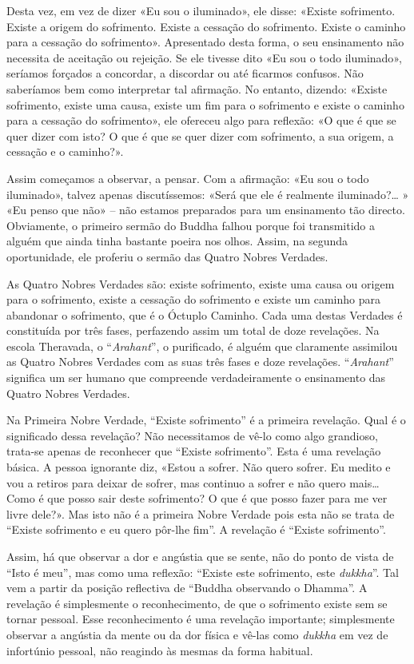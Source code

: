 Desta vez, em vez de dizer «Eu sou o iluminado», ele disse: «Existe sofrimento.
Existe a origem do sofrimento. Existe a cessação do sofrimento. Existe o caminho
para a cessação do sofrimento». Apresentado desta forma, o seu ensinamento não
necessita de aceitação ou rejeição. Se ele tivesse dito «Eu sou o todo
iluminado», seríamos forçados a concordar, a discordar ou até ficarmos confusos.
Não saberíamos bem como interpretar tal afirmação. No entanto, dizendo: «Existe
sofrimento, existe uma causa, existe um fim para o sofrimento e existe o caminho
para a cessação do sofrimento», ele ofereceu algo para reflexão: «O que é que se
quer dizer com isto? O que é que se quer dizer com sofrimento, a sua origem, a
cessação e o caminho?».

Assim começamos a observar, a pensar. Com a afirmação: «Eu sou o todo
iluminado», talvez apenas discutíssemos: «Será que ele é realmente
iluminado?\ldots{} » «Eu penso que não» – não estamos preparados para um ensinamento
tão directo. Obviamente, o primeiro sermão do Buddha falhou porque foi
transmitido a alguém que ainda tinha bastante poeira nos olhos. Assim, na
segunda oportunidade, ele proferiu o sermão das Quatro Nobres Verdades.

\sectionBreak

As Quatro Nobres Verdades são: existe sofrimento, existe uma causa ou origem
para o sofrimento, existe a cessação do sofrimento e existe um caminho para
abandonar o sofrimento, que é o Óctuplo Caminho. Cada uma destas Verdades é
constituída por três fases, perfazendo assim um total de doze revelações. Na
escola Theravada, o “\emph{Arahant}”, o purificado, é alguém que claramente
assimilou as Quatro Nobres Verdades com as suas três fases e doze revelações.
“\emph{Arahant}” significa um ser humano que compreende verdadeiramente o
ensinamento das Quatro Nobres Verdades.

Na Primeira Nobre Verdade, “Existe sofrimento” é a primeira revelação. Qual é o
significado dessa revelação? Não necessitamos de vê-lo como algo grandioso,
trata-se apenas de reconhecer que “Existe sofrimento”. Esta é uma revelação
básica. A pessoa ignorante diz, «Estou a sofrer. Não quero sofrer. Eu medito e
vou a retiros para deixar de sofrer, mas continuo a sofrer e não quero
mais\ldots{} Como é que posso sair deste sofrimento? O que é que posso fazer
para me ver livre dele?». Mas isto não é a primeira Nobre Verdade pois esta não
se trata de “Existe sofrimento e eu quero pôr-lhe fim”. A revelação é “Existe
sofrimento”.

Assim, há que observar a dor e angústia que se sente, não do ponto de vista de
“Isto é meu”, mas como uma reflexão: “Existe este sofrimento, este
\emph{dukkha}”. Tal vem a partir da posição reflectiva de “Buddha observando o
Dhamma”. A revelação é simplesmente o reconhecimento, de que o sofrimento existe
sem se tornar pessoal. Esse reconhecimento é uma revelação importante;
simplesmente observar a angústia da mente ou da dor física e vê-las como
\emph{dukkha} em vez de infortúnio pessoal, não reagindo às mesmas da forma
habitual.

